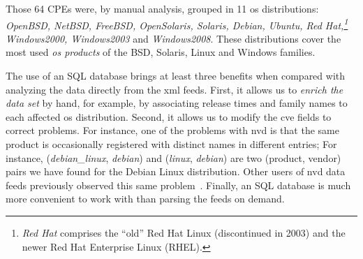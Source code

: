 Those 64 CPEs were, by manual analysis, grouped in 11 \gls{os} distributions: \textit{OpenBSD, NetBSD, FreeBSD, OpenSolaris, Solaris, Debian, Ubuntu, Red Hat,\footnote{\textit{Red Hat} comprises the ``old'' Red Hat Linux (discontinued in 2003) and the newer Red Hat Enterprise Linux (RHEL).} Windows2000, Windows2003} and \textit{Windows2008}.
These distributions cover the most used \emph{\gls{os} products} of the BSD, Solaris, Linux and Windows families.





The use of an SQL database brings at least three benefits when compared with analyzing the data directly from the \gls{xml} feeds.
First, it allows us to \emph{enrich the data set} by hand, for example, by associating release times and family names to each affected \gls{os} distribution.
Second, it allows us to modify the \gls{cve} fields to correct problems.
For instance, one of the problems with \gls{nvd} is that the same product is occasionally registered with distinct names in different entries;
For instance, (\textit{debian\_linux}, \textit{debian}) and (\textit{linux}, \textit{debian}) are two (product, vendor) pairs we have found for the Debian Linux distribution.
Other users of \gls{nvd} data feeds previously observed this same problem~\cite{cvedetails}.
Finally, an SQL database is much more convenient to work with than parsing the feeds on demand.

